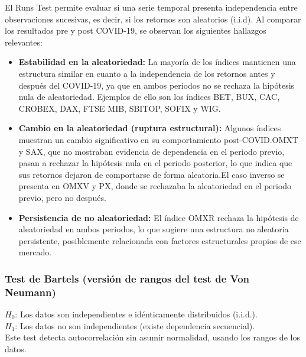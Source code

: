 \documentclass[12pt]{article}
\begin{document}
El Runs Test permite evaluar si una serie temporal presenta independencia entre observaciones sucesivas, es decir, si los retornos son aleatorios (i.i.d). Al comparar los resultados pre y post COVID-19, se observan los siguientes hallazgos relevantes:

\begin{itemize}

\item \textbf {Estabilidad en la aleatoriedad:} La mayoría de los índices mantienen una estructura similar en cuanto a la independencia de los retornos antes y después del COVID-19, ya que en ambos periodos no se rechaza la hipótesis nula de aleatoriedad. Ejemplos de ello son los índices BET, BUX, CAC, CROBEX, DAX, FTSE MIB, SBITOP, SOFIX y WIG.

\item \textbf  {Cambio en la aleatoriedad (ruptura estructural):} Algunos índices muestran un cambio significativo en su comportamiento post-COVID.OMXT y SAX, que no mostraban evidencia de dependencia en el periodo previo, pasan a rechazar la hipótesis nula en el periodo posterior, lo que indica que sus retornos dejaron de comportarse de forma aleatoria.El caso inverso se presenta en OMXV y PX, donde se rechazaba la aleatoriedad en el periodo previo, pero no después.\\

\item \textbf  {Persistencia de no aleatoriedad:} El índice OMXR rechaza la hipótesis de aleatoriedad en ambos periodos, lo que sugiere una estructura no aleatoria persistente, posiblemente relacionada con factores estructurales propios de ese mercado.

\end{itemize}   


\subsubsection {\large Test de Bartels (versión de rangos del test de Von Neumann)}

$H_0$: Los datos son independientes e idénticamente distribuidos (i.i.d.).\\
$H_1$: Los datos no son independientes (existe dependencia secuencial).\\

Este test detecta autocorrelación sin asumir normalidad, usando los rangos de los datos.
\end{document}
